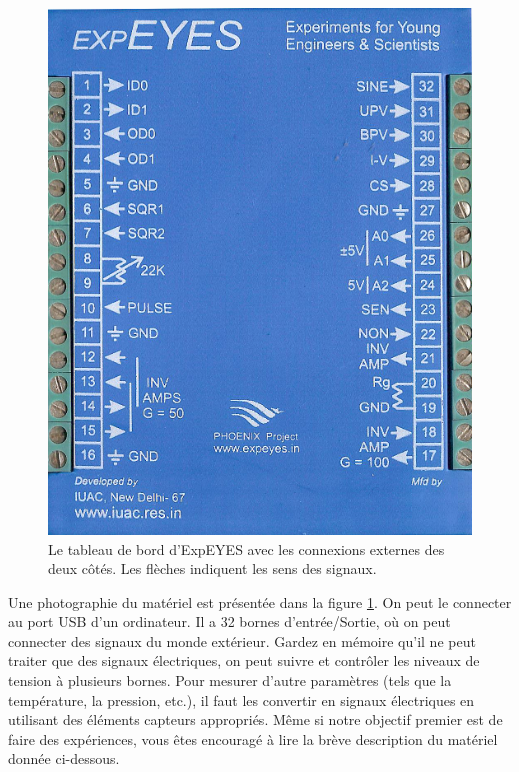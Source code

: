 \documentclass{book}
\begin{document}
\begin{figure}[h!]
\begin{center}
\caption{Le tableau de bord d'ExpEYES avec les connexions externes des deux côtés. Les flèches indiquent les sens des signaux. \label{fig:ExpEYES-top-panel}}\vspace{0.5em}
\includegraphics{top-panelcolor.png}
\end{center}
\end{figure}






Une photographie du matériel est présentée dans la figure  \ref{fig:ExpEYES-top-panel}. On peut le connecter au port USB d'un ordinateur. Il a 32 bornes d'entrée/Sortie, où on peut connecter des signaux du monde extérieur. Gardez en mémoire qu'il ne peut traiter que des signaux électriques, on peut suivre et contrôler les niveaux de tension à plusieurs bornes. Pour mesurer d'autre paramètres (tels que la température, la pression, etc.), il faut les convertir en signaux électriques en utilisant des éléments capteurs appropriés. Même si notre objectif premier est de faire des expériences, vous êtes encouragé à lire la brève description du matériel donnée ci-dessous.
\end{document}
